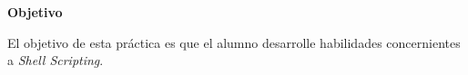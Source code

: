 \documentclass[a4paper,11pt]{exam}
\begin{document}
\maketitle

\textbf{Objetivo}

El objetivo de esta práctica es que el alumno desarrolle habilidades concernientes a \emph{Shell Scripting}.


\end{document}
